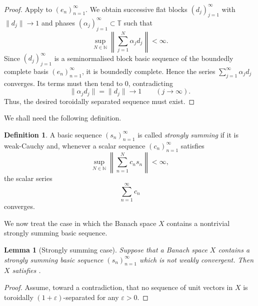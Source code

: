 \documentclass[11pt,reqno]{amsart}
\makeatletter
\theoremstyle{plain}
\newtheorem{lemma}[lemma]{Lemma}
\theoremstyle{definition}
\newtheorem{definition}[definition]{Definition}
\newcommand{\N}{\mathbb N}
\newcommand{\T}{\mathbb T}
\newcommand{\eps}{\varepsilon}
\newcounter{problempaper}
\newenvironment{problempaperbody}{%
  \setcounter{subsection}{0}%
  \setcounter{subsubsection}{0}%
  \setcounter{paragraph}{0}%
  \renewcommand{\thesubsection}{\arabic{subsection}}%
  \renewcommand{\thesubsubsection}{\thesubsection.\arabic{subsubsection}}%
  \renewcommand{\theparagraph}{\thesubsubsection.\arabic{paragraph}}%
  \let\problem@outersection\section
  \let\problem@outersubsection\subsection
  \let\problem@outersubsubsection\subsubsection
  \let\problem@outerparagraph\paragraph
  \let\section\problem@papersection
  \let\subsection\problem@papersubsection
  \let\subsubsection\problem@papersubsubsection
}{%
  \let\section\problem@outersection
  \let\subsection\problem@outersubsection
  \let\subsubsection\problem@outersubsubsection
  \let\paragraph\problem@outerparagraph
}
\newcommand{\problem@target}[2]{%
  \hypertarget{problem-\theproblempaper-#1-#2}{}%
}
\newcommand{\problem@paperheading}[3]{%
  \par\bigskip
  \problem@target{#1}{#2}%
  \noindent{\large\bfseries #2.\quad #3\par}%
  \nobreak\smallskip
}
\newcommand{\problem@papersubheading}[3]{%
  \par\medskip
  \problem@target{#1}{#2}%
  \noindent{\normalsize\bfseries #2.\quad #3\par}%
  \nobreak\smallskip
}
\newcommand{\problem@papersubsubheading}[3]{%
  \par\smallskip
  \problem@target{#1}{#2}%
  \noindent{\normalsize\itshape #2.\quad #3.\ }%
}
\def\problem@papersection{%
  \@ifstar{\problem@papersectionstar}{\problem@papersectionnostar}%
}
\def\problem@papersectionstar#1{%
  \par\bigskip\noindent{\large\bfseries #1\par}\nobreak\smallskip
}
\def\problem@papersectionnostar#1{%
  \refstepcounter{subsection}%
  \setcounter{subsubsection}{0}%
  \setcounter{paragraph}{0}%
  \problem@paperheading{section}{\thesubsection}{#1}%
  \problem@writecontentsline{section}{\thesubsection}{#1}%
}
\def\problem@papersubsection{%
  \@ifstar{\problem@papersubsectionstar}{\problem@papersubsectionnostar}%
}
\def\problem@papersubsectionstar#1{%
  \par\medskip\noindent{\normalsize\bfseries #1\par}\nobreak\smallskip
}
\def\problem@papersubsectionnostar#1{%
  \refstepcounter{subsubsection}%
  \setcounter{paragraph}{0}%
  \problem@papersubheading{subsection}{\thesubsubsection}{#1}%
  \problem@writecontentsline{subsection}{\thesubsubsection}{#1}%
}
\def\problem@papersubsubsection{%
  \@ifstar{\problem@papersubsubsectionstar}{\problem@papersubsubsectionnostar}%
}
\def\problem@papersubsubsectionstar#1{%
  \par\smallskip\noindent{\normalsize\itshape #1.\ }%
}
\def\problem@papersubsubsectionnostar#1{%
  \refstepcounter{paragraph}%
  \problem@papersubsubheading{subsubsection}{\theparagraph}{#1}%
  \problem@writecontentsline{subsubsection}{\theparagraph}{#1}%
}
\newcommand{\problem@writecontentsline}[3]{%
  \begingroup
  \protected@write\@auxout{}{%
    \string\problemcontentsentry{\theproblempaper}{#1}{#2}{#3}{\thepage}%
  }%
  \endgroup
}
\newcommand{\problemcontentsentry}[5]{%
  \@ifundefined{problemcontents@#1}{%
    \expandafter\gdef\csname problemcontents@#1\endcsname{}%
  }{}%
  \expandafter\g@addto@macro\csname problemcontents@#1\endcsname{%
    \problemcontentsline{#1}{#2}{#3}{#4}{#5}%
  }%
}
\newcommand{\problemcontentslink}[4]{%
  \hyperlink{problem-#1-#2-#3}{#4}%
}
\newcommand{\problemcontentsline}[5]{%
  \ifstrequal{#2}{section}{%
    \par\noindent
    \problemcontentslink{#1}{#2}{#3}{\makebox[2.5em][l]{#3}#4}%
    \nobreak\dotfill
    \problemcontentslink{#1}{#2}{#3}{#5}\par
  }{%
    \ifstrequal{#2}{subsection}{%
      \par\noindent\hspace*{1.5em}%
      \problemcontentslink{#1}{#2}{#3}{\makebox[3.5em][l]{#3}#4}%
      \nobreak\dotfill
      \problemcontentslink{#1}{#2}{#3}{#5}\par
    }{%
      \par\noindent\hspace*{3em}%
      \problemcontentslink{#1}{#2}{#3}{\makebox[4.5em][l]{#3}#4}%
      \nobreak\dotfill
      \problemcontentslink{#1}{#2}{#3}{#5}\par
    }%
  }%
}
\makeatother
\begin{document}
\begin{problempaperbody}
\begin{proof}
Apply  to $(e_n)_{n=1}^{\infty}$. We obtain successive flat blocks $(d_j)_{j=1}^{\infty}$ with $\|d_j\|\to1$ and phases $(\alpha_j)_{j=1}^{\infty}\subset\T$ such that
\begin{equation*}
        \sup_{N \in \N} \left\|\sum_{j=1}^N \alpha_j d_j\right\|<\infty .
\end{equation*}
Since $(d_j)_{j=1}^{\infty}$ is a seminormalised block basic sequence of the boundedly complete basis $(e_n)_{n=1}^{\infty}$, it is boundedly complete. Hence the series $\sum_{j=1}^{\infty} \alpha_j d_j$ converges. Its terms must then tend to $0$, contradicting
\begin{equation*}
        \|\alpha_j d_j\|=\|d_j\|\longrightarrow 1
        \qquad (j\to\infty).
\end{equation*}
Thus, the desired toroidally separated sequence must exist.
\end{proof}

We shall need the following definition.

\begin{definition}
\label{p1-first:def:strongly-summing}
A basic sequence $(s_n)_{n=1}^{\infty}$ is called \emph{strongly summing} if it is weak-Cauchy and, whenever a scalar sequence $(c_n)_{n=1}^{\infty}$ satisfies
\begin{equation*}
        \sup_{N\in\N}\left\|\sum_{n=1}^{N} c_n s_n\right\|<\infty,
\end{equation*}
the scalar series
\begin{equation*}
        \sum_{n=1}^{\infty} c_n
\end{equation*}
converges.
\end{definition}

We now treat the case in which the Banach space $X$ contains a nontrivial strongly summing basic sequence.

\begin{lemma}[Strongly summing case]
\label{p1-first:lem:strongly-summing}
Suppose that a Banach space $X$ contains a strongly summing basic sequence $(s_n)_{n=1}^{\infty}$ which is not weakly convergent. Then $X$ satisfies .
\end{lemma}
\begin{proof}
Assume, toward a contradiction, that no sequence of unit vectors in $X$ is toroidally $(1+\eps)$-separated for any $\eps>0$.


\end{proof}
\end{problempaperbody}
\end{document}
